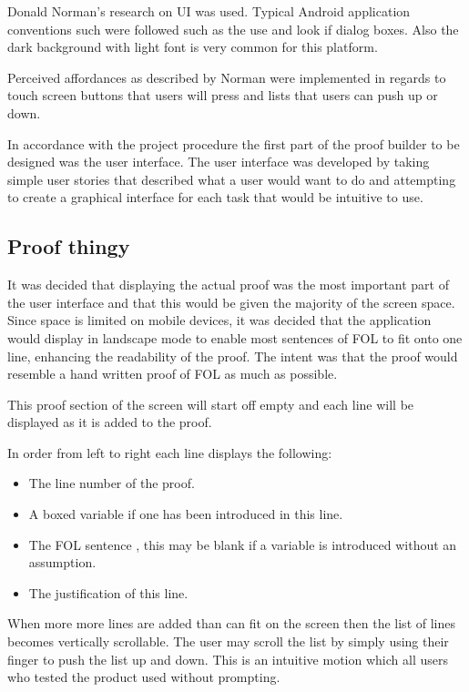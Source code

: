 Donald Norman's research on UI was used.
Typical Android application conventions such were followed such as the use and look if dialog boxes. Also the dark background with light font is very common for this platform.

Perceived affordances as described by Norman were implemented in regards to touch screen buttons that users will press and lists that users can push up or down.

In accordance with the project procedure the first part of the proof builder to be designed was the user interface. The user interface was developed by taking simple user stories that described what a user would want to do and attempting to create a graphical interface for each task that would be intuitive to use.

\subsection{Proof thingy}
It was decided that displaying the actual proof was the most important part of the user interface and that this would be given the majority of the screen space. Since space is limited on mobile devices, it was decided that the application would display in landscape mode to enable most sentences of FOL to fit onto one line, enhancing the readability of the proof. The intent was that the proof would resemble a hand written proof of FOL as much as possible. 

This proof section of the screen will start off empty and each line will be displayed as it is added to the proof.

In order from left to right each line displays the following:
\begin{itemize}
\item{The line number of the proof.}
\item{A boxed variable if one has been introduced in this line. }
\item{The FOL sentence , this may be blank if a variable is introduced without an assumption.}
\item{The justification of this line.}
\end{itemize}
When more more lines are added than can fit on the screen then the list of lines becomes vertically scrollable. The user may scroll the list by simply using their finger to push the list up and down. This is an intuitive motion which all users who tested the product used without prompting.

